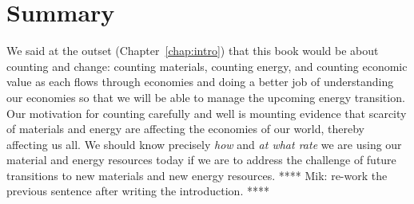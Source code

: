 %
%
%


\chapter{Summary}
\label{chap:summary}





We said at the outset (Chapter~\ref{chap:intro})
that this book would be about counting and change:
counting materials, counting energy, and counting economic value
as each flows through economies 
and doing a better job of understanding our economies 
so that we will be able to manage the upcoming energy transition.
Our motivation for counting carefully and well
is mounting evidence that 
scarcity of materials and energy are affecting
the economies of our world, thereby affecting us all.
We should know precisely \emph{how} and \emph{at what rate} 
we are using our material and energy resources today
if we are to address the challenge of future transitions to new materials and 
new energy resources. 
**** Mik: re-work the previous sentence after writing the introduction. ****


